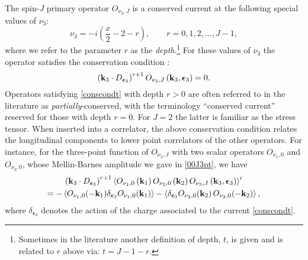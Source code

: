 \documentclass[11pt,a4paper]{article}
\begin{document}
The spin-$J$ primary operator $O_{\nu_3,J}$ is a conserved current at the following special values of $\nu_3$:
\begin{equation}\label{pmnu3}
    \nu_3 = -i\left(\frac{x}{2}-2-r\right), \qquad r = 0, 1, 2, \ldots, J-1,
\end{equation}
where we refer to the parameter $r$ as the \emph{depth}.\footnote{Sometimes in the literature another definition of depth, $t$, is given and is related to $r$ above via: $t=J-1-r$.} For these values of $\nu_3$ the operator satisfies the conservation condition \cite{Dolan:2001ih,Deser:2003gw}:
\begin{equation}\label{conscondt}
    \left({\bf k}_3 \cdot D_{{\boldsymbol{\epsilon}}_3}\right)^{r+1}O_{\nu_3,J}\left({\bf k}_3,\boldsymbol{\epsilon}_3\right) = 0.
\end{equation}
Operators satisfying \eqref{conscondt} with depth $r>0$ are often referred to in the literature as \emph{partially}-conserved, with the terminology ``conserved current'' reserved for those with depth $r=0$. For $J=2$ the latter is familiar as the stress tensor. When inserted into a correlator, the above conservation condition relates the longitudinal components to lower point correlators of the other operators. For instance, for the three-point function of $O_{\nu_3,J}$ with two scalar operators $O_{\nu_{1},0}$ and $O_{\nu_{2},0}$, whose Mellin-Barnes amplitude we gave in \eqref{00J3pt}, we have
\begin{multline}\label{WT00J}
   \left({\bf k}_3 \cdot D_{{\boldsymbol{\epsilon}}_3}\right)^{r+1} \langle O_{\nu_{1},0}\left({\bf k}_1\right) O_{\nu_{2},0}\left({\bf k}_2\right) O_{\nu_3,J}\left({\bf k}_3,\boldsymbol{\epsilon}_3\right) \rangle^\prime \\= -\left\langle O_{\nu_1,0}(-\mathbf{k}_1) \delta_{{\boldsymbol{\epsilon}}_3}O_{\nu_1,0}(\mathbf{k}_1)\right\rangle-\left\langle\delta_{{\boldsymbol{\epsilon}}_3}O_{\nu_2,0}(\mathbf{k}_2)\,O_{\nu_2,0}(-\mathbf{k}_2)\right\rangle,
\end{multline}
where $\delta_{{\boldsymbol{\epsilon}}_3}$ denotes the action of the charge associated to the current \eqref{conscondt}. 
\end{document}
